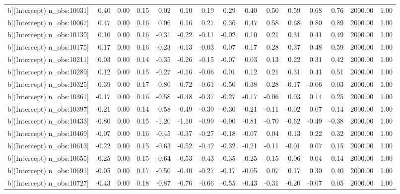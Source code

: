 \begin{table}[ht]
\begin{tabular}{rrrrrrrrrrrrrrr}
  b[(Intercept) n\_obs:10031] & 0.40 & 0.00 & 0.15 & 0.02 & 0.10 & 0.19 & 0.29 & 0.40 & 0.50 & 0.59 & 0.68 & 0.76 & 2000.00 & 1.00 \\ 
  b[(Intercept) n\_obs:10067] & 0.47 & 0.00 & 0.16 & 0.06 & 0.16 & 0.27 & 0.36 & 0.47 & 0.58 & 0.68 & 0.80 & 0.89 & 2000.00 & 1.00 \\ 
  b[(Intercept) n\_obs:10139] & 0.10 & 0.00 & 0.16 & -0.31 & -0.22 & -0.11 & -0.02 & 0.10 & 0.21 & 0.31 & 0.41 & 0.49 & 2000.00 & 1.00 \\ 
  b[(Intercept) n\_obs:10175] & 0.17 & 0.00 & 0.16 & -0.23 & -0.13 & -0.03 & 0.07 & 0.17 & 0.28 & 0.37 & 0.48 & 0.59 & 2000.00 & 1.00 \\ 
  b[(Intercept) n\_obs:10211] & 0.03 & 0.00 & 0.14 & -0.35 & -0.26 & -0.15 & -0.07 & 0.03 & 0.13 & 0.22 & 0.31 & 0.42 & 2000.00 & 1.00 \\ 
  b[(Intercept) n\_obs:10289] & 0.12 & 0.00 & 0.15 & -0.27 & -0.16 & -0.06 & 0.01 & 0.12 & 0.21 & 0.31 & 0.41 & 0.51 & 2000.00 & 1.00 \\ 
  b[(Intercept) n\_obs:10325] & -0.39 & 0.00 & 0.17 & -0.80 & -0.72 & -0.61 & -0.50 & -0.38 & -0.28 & -0.17 & -0.06 & 0.03 & 2000.00 & 1.00 \\ 
  b[(Intercept) n\_obs:10361] & -0.17 & 0.00 & 0.16 & -0.58 & -0.48 & -0.37 & -0.27 & -0.17 & -0.06 & 0.03 & 0.14 & 0.25 & 2000.00 & 1.00 \\ 
  b[(Intercept) n\_obs:10397] & -0.21 & 0.00 & 0.14 & -0.58 & -0.49 & -0.39 & -0.30 & -0.21 & -0.11 & -0.02 & 0.07 & 0.14 & 2000.00 & 1.00 \\ 
  b[(Intercept) n\_obs:10433] & -0.80 & 0.00 & 0.15 & -1.20 & -1.10 & -0.99 & -0.90 & -0.81 & -0.70 & -0.62 & -0.49 & -0.38 & 2000.00 & 1.00 \\ 
  b[(Intercept) n\_obs:10469] & -0.07 & 0.00 & 0.16 & -0.45 & -0.37 & -0.27 & -0.18 & -0.07 & 0.04 & 0.13 & 0.22 & 0.32 & 2000.00 & 1.00 \\ 
  b[(Intercept) n\_obs:10613] & -0.22 & 0.00 & 0.15 & -0.63 & -0.52 & -0.42 & -0.32 & -0.21 & -0.11 & -0.01 & 0.07 & 0.15 & 2000.00 & 1.00 \\ 
  b[(Intercept) n\_obs:10655] & -0.25 & 0.00 & 0.15 & -0.64 & -0.53 & -0.43 & -0.35 & -0.25 & -0.15 & -0.06 & 0.04 & 0.14 & 2000.00 & 1.00 \\ 
  b[(Intercept) n\_obs:10691] & -0.05 & 0.00 & 0.17 & -0.50 & -0.40 & -0.27 & -0.17 & -0.05 & 0.07 & 0.17 & 0.30 & 0.40 & 2000.00 & 1.00 \\ 
  b[(Intercept) n\_obs:10727] & -0.43 & 0.00 & 0.18 & -0.87 & -0.76 & -0.66 & -0.55 & -0.43 & -0.31 & -0.20 & -0.07 & 0.05 & 2000.00 & 1.00 \\ 

\end{tabular}
\end{table}
